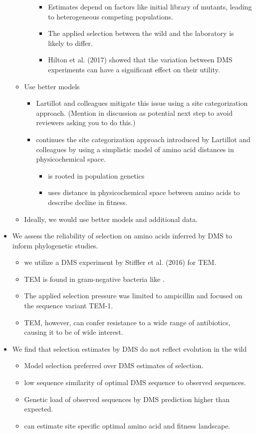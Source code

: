 \documentclass[12pt]{article}
\begin{document}
\begin{itemize}
\begin{itemize}
\begin{itemize}
\begin{itemize}
				\item Estimates depend on factors like initial library of mutants, leading to heterogeneous competing populations.
				\item The applied selection between the wild and the laboratory is likely to differ.
				\item Hilton et al. (2017) showed that the variation between DMS experiments can have a significant effect on their utility.
			\end{itemize}
		\end{itemize}
		\item Use better models
		\begin{itemize}
			\item Lartillot and colleagues mitigate this issue using a site categorization approach. (Mention in discussion as potential next step to avoid reviewers asking you to do this.)
			\item \selac continues the site categorization approach introduced by Lartillot and colleagues by using a simplistic model of amino acid distances in physicochemical space.
			\begin{itemize}
				\item \selac is rooted in population genetics
				\item \selac uses distance in physicochemical space between amino acids to describe decline in fitness.
			\end{itemize}        
		\end{itemize}
		\item Ideally, we would use better models and additional data.
	\end{itemize}
	\item We assess the reliability of selection on amino acids inferred by DMS to inform phylogenetic studies.
	\begin{itemize}
		\item we utilize a DMS experiment by Stiffler et al. (2016) for TEM.
		\item TEM is found in gram-negative bacteria like \ecoli.
		\item The applied selection pressure was limited to ampicillin and focused on the sequence variant TEM-1.
		\item TEM, however, can confer resistance to a wide range of antibiotics, causing it to be of wide interest.
	\end{itemize}
	\item We find that selection estimates by DMS do not reflect evolution in the wild
	\begin{itemize}
		\item Model selection preferred \selac over DMS estimates of selection.
		\item low sequence similarity of optimal DMS sequence to observed sequences.
		\item Genetic load of observed sequences by DMS prediction higher than expected.
		\item \selac can estimate site specific optimal amino acid and fitness landscape.
	\end{itemize}
\end{itemize}
\end{document}

